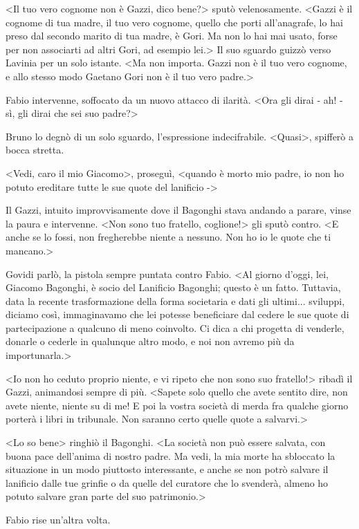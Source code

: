 <Il tuo vero cognome non è Gazzi, dico bene?> sputò velenosamente. <Gazzi è il cognome di tua madre, il tuo vero cognome, quello che porti all'anagrafe, lo hai preso dal secondo marito di tua madre, è Gori. Ma non lo hai mai usato, forse per non associarti ad altri Gori, ad esempio lei.> Il suo sguardo guizzò verso Lavinia per un solo istante. <Ma non importa. Gazzi non è il tuo vero cognome, e allo stesso modo Gaetano Gori non è il tuo vero padre.>

Fabio intervenne, soffocato da un nuovo attacco di ilarità. <Ora gli dirai - ah! - sì, gli dirai che sei suo padre?>

Bruno lo degnò di un solo sguardo, l'espressione indecifrabile. <Quasi>, spifferò a bocca stretta.

<Vedi, caro il mio Giacomo>, proseguì, <quando è morto mio padre, io non ho potuto ereditare tutte le sue quote del lanificio ->

Il Gazzi, intuito improvvisamente dove il Bagonghi stava andando a parare, vinse la paura e intervenne. <Non sono tuo fratello, coglione!> gli sputò contro. <E anche se lo fossi, non fregherebbe niente a nessuno. Non ho io le quote che ti mancano.>

Govidi parlò, la pistola sempre puntata contro Fabio. <Al giorno d'oggi, lei, Giacomo Bagonghi, è socio del Lanificio Bagonghi; questo è un fatto. Tuttavia, data la recente trasformazione della forma societaria e dati gli ultimi... sviluppi, diciamo così, immaginavamo che lei potesse beneficiare dal cedere le sue quote di partecipazione a qualcuno di meno coinvolto. Ci dica a chi progetta di venderle, donarle o cederle in qualunque altro modo, e noi non avremo più da importunarla.>

<Io non ho ceduto proprio niente, e vi ripeto che non sono suo fratello!> ribadì il Gazzi, animandosi sempre di più. <Sapete solo quello che avete sentito dire, non avete niente, niente su di me! E poi la vostra società di merda fra qualche giorno porterà i libri in tribunale. Non saranno certo quelle quote a salvarvi.>

<Lo so bene> ringhiò il Bagonghi. <La società non può essere salvata, con buona pace dell'anima di nostro padre. Ma vedi, la mia morte ha sbloccato la situazione in un modo piuttosto interessante, e anche se non potrò salvare il lanificio dalle tue grinfie o da quelle del curatore che lo svenderà, almeno ho potuto salvare gran parte del suo patrimonio.>

Fabio rise un'altra volta.

